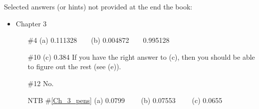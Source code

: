 \documentclass[12pt]{article}
\begin{document}
Selected answers (or hints) not provided at the end the book:
\begin{itemize}  %


%
%

\item Chapter 3          \label{ANS_3}
	\begin{itemize}
	\item[\#4]  (a) 0.111328\ \ \ \ (b) 0.004872\ \ \ \ 0.995128
	\item[\#10] (c)  0.384 If you have the right answer to (c), then you should be able to figure out the rest (see (e)).
	\item[\#12] No.
	\item[NTB \#\ref{Ch_3_pens}]  (a) 0.0799 \ \ \ \ (b) 0.07553 \ \ \ \ (c) 0.0655
	\end{itemize}


\end{itemize}
\end{document}

